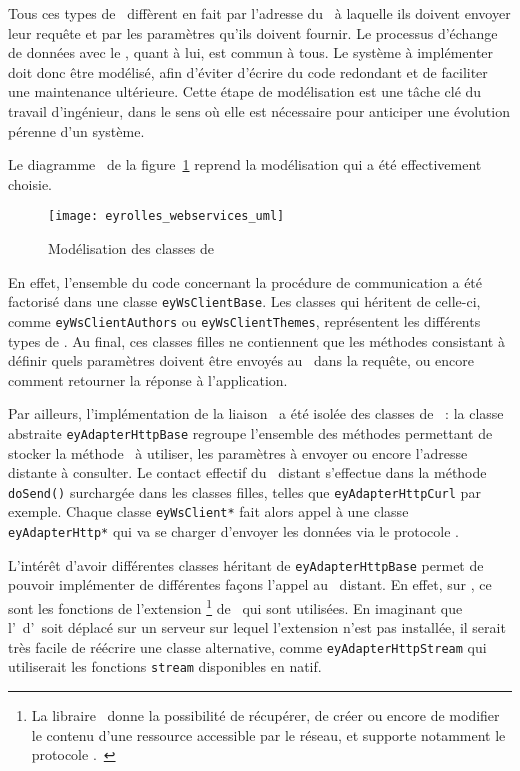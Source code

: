 Tous ces types de \aws\ diffèrent en fait par l'adresse du \alotun\ à laquelle ils doivent envoyer leur requête et par les paramètres qu'ils doivent fournir. Le processus d'échange de données avec le \alotun, quant à lui, est commun à tous. Le système à implémenter doit donc être modélisé, afin d'éviter d'écrire du code redondant et de faciliter une maintenance ultérieure. Cette étape de modélisation est une tâche clé du travail d'ingénieur, dans le sens où elle est nécessaire pour anticiper une évolution pérenne d'un système.

Le diagramme \auml\ de la figure~\ref{figure:eyrolles_webservices_uml} reprend la modélisation qui a été effectivement choisie.

\begin{figure}
	\centering
	\texttt{[image: eyrolles\_webservices\_uml]}
	\caption{Modélisation des classes de \aws}
	\label{figure:eyrolles_webservices_uml}
\end{figure}

En effet, l'ensemble du code concernant la procédure de communication a été factorisé dans une classe \texttt{eyWsClientBase}. Les classes qui héritent de celle-ci, comme \texttt{eyWsClientAuthors} ou \texttt{eyWsClientThemes}, représentent les différents types de \aws. Au final, ces classes filles ne contiennent que les méthodes consistant à définir quels paramètres doivent être envoyés au \alotun\ dans la requête, ou encore comment retourner la réponse à l'application.

Par ailleurs, l'implémentation de la liaison \ahttp\ a été isolée des classes de \aws\ : la classe abstraite \texttt{eyAdapterHttpBase} regroupe l'ensemble des méthodes permettant de stocker la méthode \ahttp\ à utiliser, les paramètres à envoyer ou encore l'adresse distante à consulter. Le contact effectif du \aws\ distant s'effectue dans la méthode \texttt{doSend()} surchargée dans les classes filles, telles que \texttt{eyAdapterHttpCurl} par exemple. Chaque classe \texttt{eyWsClient*} fait alors appel à une classe \texttt{eyAdapterHttp*} qui va se charger d'envoyer les données via le protocole \ahttp.

L'intérêt d'avoir différentes classes héritant de \texttt{eyAdapterHttpBase} permet de pouvoir implémenter de différentes façons l'appel au \aws\ distant. En effet, sur \aey, ce sont les fonctions de l'extension \acurl\footnote{La libraire \acurl\ donne la possibilité de récupérer, de créer ou encore de modifier le contenu d'une ressource accessible par le réseau, et supporte notamment le protocole \ahttp.~\cite{curl}} de \aphp\ qui sont utilisées. En imaginant que l'\aintranet\ d'\aey\ soit déplacé sur un serveur sur lequel l'extension n'est pas installée, il serait très facile de réécrire une classe alternative, comme \texttt{eyAdapterHttpStream} qui utiliserait les fonctions \texttt{stream} disponibles en natif.

